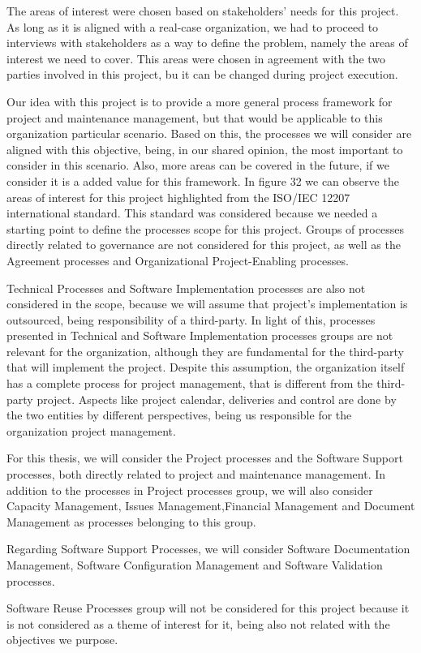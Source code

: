 The areas of interest were chosen based on stakeholders' needs for this project. As long as it is aligned with a real-case organization, we had to proceed to interviews with stakeholders as a way to define the problem, namely the areas of interest we need to cover. This areas were chosen in agreement with the two parties involved in this project, bu it can be changed during project execution.\par
Our idea with this project is to provide a more general process framework for project and maintenance management, but that would be applicable to this organization particular scenario. Based on this, the processes we will consider are aligned with this objective, being, in our shared opinion, the most important to consider in this scenario. Also, more areas can be covered in the future, if we consider it is a added value for this framework.  
In figure 32 we can observe the areas of interest for this project highlighted from the ISO/IEC 12207 international standard. This standard was considered because we needed a starting point to define the processes scope for this project. Groups of processes directly related to governance are not considered for this project, as well as the Agreement processes and Organizational Project-Enabling processes.\par
Technical Processes and Software Implementation processes are also not considered in the scope, because we will assume that project's implementation is outsourced, being responsibility of a third-party. In light of this, processes presented in Technical and Software Implementation processes groups are not relevant for the organization, although they are fundamental for the third-party that will implement the project. Despite this assumption, the organization itself has a complete process for project management, that is different from the third-party project. Aspects like project calendar, deliveries and control are done by the two entities by different perspectives, being us responsible for the organization project management.\par
For this thesis, we will consider the Project processes and the Software Support processes, both directly related to project and maintenance management. In addition to the processes in Project processes group, we will also consider Capacity Management, Issues Management,Financial Management and Document Management as processes belonging to this group.\par
Regarding Software Support Processes, we will consider Software Documentation Management, Software Configuration Management and Software Validation processes.\par
Software Reuse Processes group will not be considered for this project because it is not considered as a theme of interest for it, being also not related with the objectives we purpose. 

